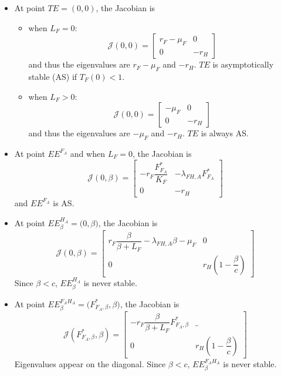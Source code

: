 \documentclass{article}
\newcommand{\lfa}{\lambda_{FH, A}}
\begin{document}
\begin{itemize}
\item At point $TE = (0, 0)$, the Jacobian is
\begin{itemize}
\item when $L_F = 0$:
\begin{equation}
\mathcal{J}(0,0) = \begin{bmatrix}
r_F-\mu_F & 0 \\
0 & -r_H
\end{bmatrix}
\end{equation}
and thus the eigenvalues are $r_F-\mu_F$ and $-r_H$. $TE$ is asymptotically stable (AS) if $T_F(0) < 1$.
\item when $L_F >0$:
\begin{equation}
\mathcal{J}(0,0) = \begin{bmatrix}
-\mu_F & 0 \\
0 & -r_H
\end{bmatrix}
\end{equation}
and thus the eigenvalues are $-\mu_F$ and $-r_H$. $TE$ is always AS.
\end{itemize}

\item At point $EE^{F_A}$ and when $L_F = 0$, the Jacobian is
\begin{equation}
\mathcal{J}(0, \beta) = \begin{bmatrix}
-r_F\dfrac{F_{F_A}^*}{K_F}& - \lfa F^*_{F_A}\\
0 & -r_H
\end{bmatrix}
\end{equation}
and $EE^{F_A}$ is AS.

\item At point $EE^{H_A}_\beta = \Big(0,\beta \Big)$, the Jacobian is
\begin{equation}
\mathcal{J}(0, \beta) = \begin{bmatrix}
r_F\dfrac{\beta}{\beta+L_F} - \lfa \beta - \mu_F & 0 \\
0 & r_H (1 - \dfrac{\beta}{c})
\end{bmatrix}
\end{equation}
Since $\beta < c$, $EE^{H_A}_\beta$ is never stable.

\item At point $EE^{F_AH_A}_\beta = \Big(F^*_{F_A,\beta},\beta \Big)$, the Jacobian is
\begin{equation}
\mathcal{J}(F^*_{F_A,\beta}, \beta) = \begin{bmatrix}
- r_F\dfrac{\beta}{\beta+L_F} F^*_{F_A,\beta} & \_ \\
0 & r_H (1 - \dfrac{\beta}{c})
\end{bmatrix}
\end{equation}
Eigenvalues appear on the diagonal. Since $\beta < c$, $EE^{F_AH_A}_\beta$ is never stable.



\end{itemize}
\end{document}
